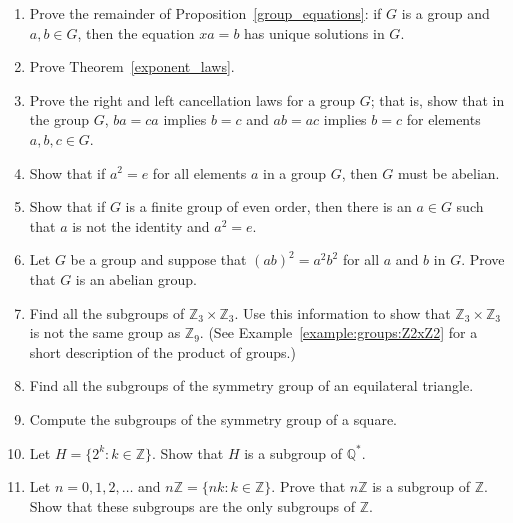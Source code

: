 {\begin{enumerate}
 
\item
Prove the remainder of Proposition~\ref{group_equations}: if $G$ is a group and $a, b \in G$, then
the equation $xa = b$ has unique solutions in $G$. 
 
\item
Prove Theorem~\ref{exponent_laws}.
 
 
\item
Prove the right and left cancellation laws for a group $G$; that is,
show that in the group $G$, $ba = ca$ implies $b = c$ and $ab = ac$
implies $b = c$ for elements $a, b, c \in G$.  
 
\item
Show that if $a^2 = e$ for all elements $a$ in a group $G$, then $G$ must be abelian. 
 
 
\item
Show that if $G$ is a finite group of even order, then there is an $a
\in G$ such that $a$ is not the identity and $a^2 = e$.
 
 
\item
Let $G$ be a group and suppose that $(ab)^2 = a^2b^2$ for all $a$ and
$b$ in $G$.  Prove that $G$ is an abelian group. 
 
 
\item
Find all the subgroups of ${\mathbb Z}_3 \times {\mathbb Z}_3$. Use this
information to show that ${\mathbb Z}_3 \times {\mathbb Z}_3$ is not the
same group as ${\mathbb Z}_9$.  (See Example~\ref{example:groups:Z2xZ2}
for a short description of the product of groups.)
 
 
\item
Find all the subgroups of the symmetry group of an equilateral
triangle. 
 
 
\item
Compute the subgroups of the symmetry group of a square.
 
 
\item
Let $H = \{2^k : k \in {\mathbb Z} \}$. Show that $H$ is a subgroup of
${\mathbb Q}^*$. 
 
 
\item
Let $n = 0, 1, 2, \ldots$ and $n {\mathbb Z} = \{ nk : k \in  {\mathbb Z}
\}$. Prove that $n {\mathbb Z}$ is a subgroup of ${\mathbb Z}$.  Show that
these subgroups are the only subgroups of $\mathbb{Z}$.
 

\end{enumerate}}

